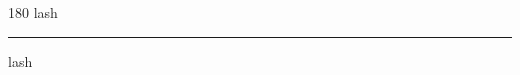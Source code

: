 
\begin{frame}
\begin{center}
\begin{turn}{180}
{\fontsize{2.5cm}{1em}\selectfont lash}
\end{turn}
\vspace{1em}\par  
\hrule
\vspace{1em}\par  
{\fontsize{2.5cm}{1em}\selectfont lash}
\end{center}
\end{frame}
